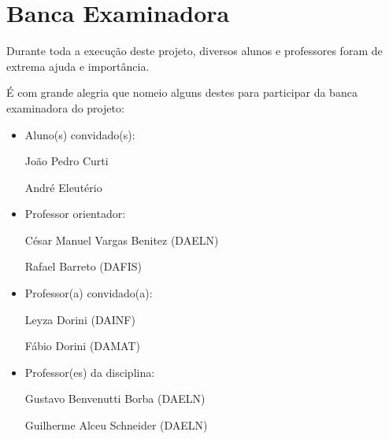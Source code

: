     \section {Banca Examinadora}

        Durante toda a execução deste projeto, diversos alunos e professores foram de extrema ajuda e importância.

        É com grande alegria que nomeio alguns destes para participar da banca examinadora do projeto:

    \begin{itemize}
        \item Aluno(s) convidado(s):

            \subitem João Pedro Curti

            \subitem André Eleutério

        \item Professor orientador:

            \subitem César Manuel Vargas Benitez (DAELN)

            \subitem Rafael Barreto (DAFIS)

        \item Professor(a) convidado(a):

            \subitem Leyza Dorini (DAINF)

            \subitem Fábio Dorini (DAMAT)

        \item Professor(es) da disciplina:

            \subitem Gustavo Benvenutti Borba (DAELN)

            \subitem Guilherme Alceu Schneider (DAELN)

    \end{itemize} 